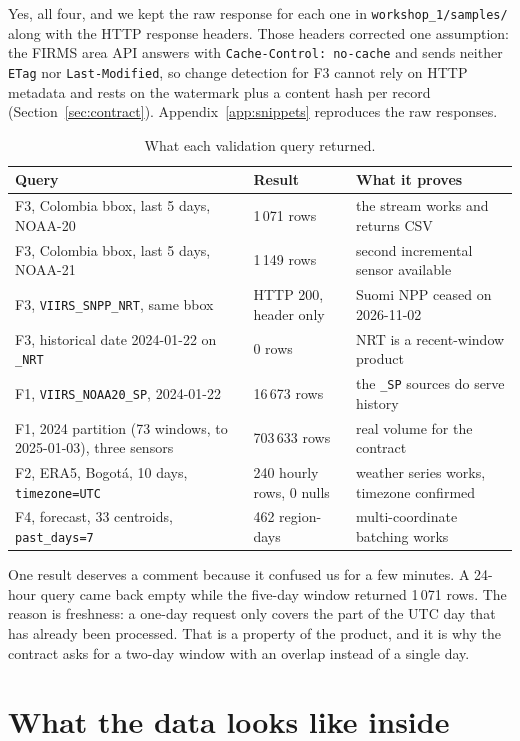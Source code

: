 \documentclass[11pt,a4paper]{article}
\newcommand{\code}[1]{\texttt{\small #1}}
\begin{document}
Yes, all four, and we kept the raw response for each one in \code{workshop\_1/samples/} along with
the HTTP response headers. Those headers corrected one assumption: the FIRMS area API answers with
\code{Cache-Control: no-cache} and sends neither \code{ETag} nor \code{Last-Modified}, so change
detection for F3 cannot rely on HTTP metadata and rests on the watermark plus a content hash per
record (Section~\ref{sec:contract}). Appendix~\ref{app:snippets} reproduces the raw responses.

\begin{table}[h]
\centering
\small
\begin{tabular}{L{5.2cm}L{2.2cm}L{7.4cm}}
\toprule
\textbf{Query} & \textbf{Result} & \textbf{What it proves} \\
\midrule
F3, Colombia bbox, last 5 days, NOAA-20 & 1\,071 rows & the stream works and returns CSV \\
F3, Colombia bbox, last 5 days, NOAA-21 & 1\,149 rows & second incremental sensor available \\
F3, \code{VIIRS\_SNPP\_NRT}, same bbox & HTTP 200, header only & Suomi NPP ceased on 2026-11-02 \\
F3, historical date 2024-01-22 on \code{*\_NRT} & 0 rows & NRT is a recent-window product \\
F1, \code{VIIRS\_NOAA20\_SP}, 2024-01-22 & 16\,673 rows & the \code{*\_SP} sources do serve history \\
F1, 2024 partition (73 windows, to 2025-01-03), three sensors & 703\,633 rows & real volume for the contract \\
F2, ERA5, Bogotá, 10 days, \code{timezone=UTC} & 240 hourly rows, 0 nulls & weather series works, timezone confirmed \\
F4, forecast, 33 centroids, \code{past\_days=7} & 462 region-days & multi-coordinate batching works \\
\bottomrule
\end{tabular}
\caption{What each validation query returned.}
\end{table}

One result deserves a comment because it confused us for a few minutes. A 24-hour query came back
empty while the five-day window returned 1\,071 rows. The reason is freshness: a one-day request only
covers the part of the UTC day that has already been processed. That is a property of the product,
and it is why the contract asks for a two-day window with an overlap instead of a single day.

\section{What the data looks like inside}
\end{document}
